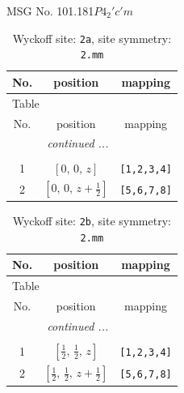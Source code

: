 \documentclass[fleqn,8pt]{jsarticle}
\begin{document}
\setcounter{MaxMatrixCols}{32}

\renewcommand{\tablename}{Table~}
\renewcommand{\figurename}{Figure~}
\begin{center}
\LARGE
MSG No. 101.181\quad$P4_{2}'c'm$
\end{center}
\renewcommand{\arraystretch}{1.2}
\begin{longtable}{ccc}
\caption{Wyckoff site: {\tt 2a}, site symmetry: {\tt 2.mm}}
 \\
 \hline \hline
No. & position & mapping \\ \hline \endfirsthead

\multicolumn{2}{l}{\tablename\ \thetable{}} \\
 \hline \hline
No. & position & mapping \\ \hline \endhead

 \hline \hline
\multicolumn{2}{r}{\footnotesize\it continued ...} \\ \endfoot

 \hline \hline
\multicolumn{2}{r}{} \\ \endlastfoot

1 & $\left[ 0,\, 0,\, z \right]$ & {\tt [1,2,3,4]} \\ \hline
2 & $\left[ 0,\, 0,\, z + \frac{1}{2} \right]$ & {\tt [5,6,7,8]} \\
\end{longtable}
\renewcommand{\arraystretch}{1.2}
\begin{longtable}{ccc}
\caption{Wyckoff site: {\tt 2b}, site symmetry: {\tt 2.mm}}
 \\
 \hline \hline
No. & position & mapping \\ \hline \endfirsthead

\multicolumn{2}{l}{\tablename\ \thetable{}} \\
 \hline \hline
No. & position & mapping \\ \hline \endhead

 \hline \hline
\multicolumn{2}{r}{\footnotesize\it continued ...} \\ \endfoot

 \hline \hline
\multicolumn{2}{r}{} \\ \endlastfoot

1 & $\left[ \frac{1}{2},\, \frac{1}{2},\, z \right]$ & {\tt [1,2,3,4]} \\ \hline
2 & $\left[ \frac{1}{2},\, \frac{1}{2},\, z + \frac{1}{2} \right]$ & {\tt [5,6,7,8]} \\
\end{longtable}
\end{document}
